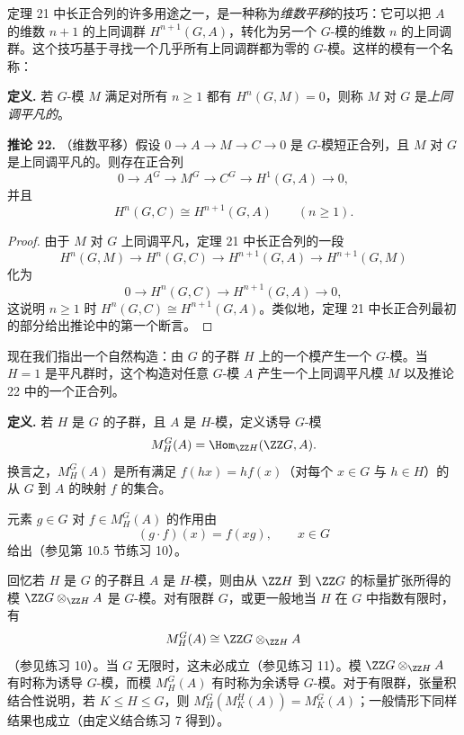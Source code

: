 定理 21 中长正合列的许多用途之一，是一种称为\emph{维数平移}的技巧：它可以把 $A$ 的维数 $n+1$ 的上同调群 $H^{n+1}(G,A)$，转化为另一个 $G$-模的维数 $n$ 的上同调群。这个技巧基于寻找一个几乎所有上同调群都为零的 $G$-模。这样的模有一个名称：

\noindent\textbf{定义.} 若 $G$-模 $M$ 满足对所有 $n\geq1$ 都有 $H^n(G,M)=0$，则称 $M$ 对 $G$ 是\emph{上同调平凡的}。

\medskip
\noindent\textbf{推论 22.} （维数平移）假设 $0\to A\to M\to C\to0$ 是 $G$-模短正合列，且 $M$ 对 $G$ 是上同调平凡的。则存在正合列
\[
  0\to A^G\to M^G\to C^G\to H^1(G,A)\to0,
\]
并且
\[
  H^n(G,C)\cong H^{n+1}(G,A)
  \qquad(n\geq1).
\]

\begin{proof}
由于 $M$ 对 $G$ 上同调平凡，定理 21 中长正合列的一段
\[
  H^n(G,M)\to H^n(G,C)\to H^{n+1}(G,A)\to H^{n+1}(G,M)
\]
化为
\[
  0\to H^n(G,C)\to H^{n+1}(G,A)\to0,
\]
这说明 $n\geq1$ 时 $H^n(G,C)\cong H^{n+1}(G,A)$。类似地，定理 21 中长正合列最初的部分给出推论中的第一个断言。
\end{proof}

现在我们指出一个自然构造：由 $G$ 的子群 $H$ 上的一个模产生一个 $G$-模。当 $H=1$ 是平凡群时，这个构造对任意 $G$-模 $A$ 产生一个上同调平凡模 $M$ 以及推论 22 中的一个正合列。

\noindent\textbf{定义.} 若 $H$ 是 $G$ 的子群，且 $A$ 是 $H$-模，定义诱导 $G$-模
\[
  M_H^G(A)=\Hom_{\ZZ H}(\ZZ G,A).
\]
换言之，$M_H^G(A)$ 是所有满足 $f(hx)=hf(x)$（对每个 $x\in G$ 与 $h\in H$）的从 $G$ 到 $A$ 的映射 $f$ 的集合。

元素 $g\in G$ 对 $f\in M_H^G(A)$ 的作用由
\[
  (g\cdot f)(x)=f(xg),
  \qquad x\in G
\]
给出（参见第 10.5 节练习 10）。

回忆若 $H$ 是 $G$ 的子群且 $A$ 是 $H$-模，则由从 $\ZZ H$ 到 $\ZZ G$ 的标量扩张所得的模 $\ZZ G\otimes_{\ZZ H}A$ 是 $G$-模。对有限群 $G$，或更一般地当 $H$ 在 $G$ 中指数有限时，有
\[
  M_H^G(A)\cong\ZZ G\otimes_{\ZZ H}A
\]
（参见练习 10）。当 $G$ 无限时，这未必成立（参见练习 11）。模 $\ZZ G\otimes_{\ZZ H}A$ 有时称为诱导 $G$-模，而模 $M_H^G(A)$ 有时称为余诱导 $G$-模。对于有限群，张量积结合性说明，若 $K\leq H\leq G$，则 $M_H^G(M_K^H(A))=M_K^G(A)$；一般情形下同样结果也成立（由定义结合练习 7 得到）。

